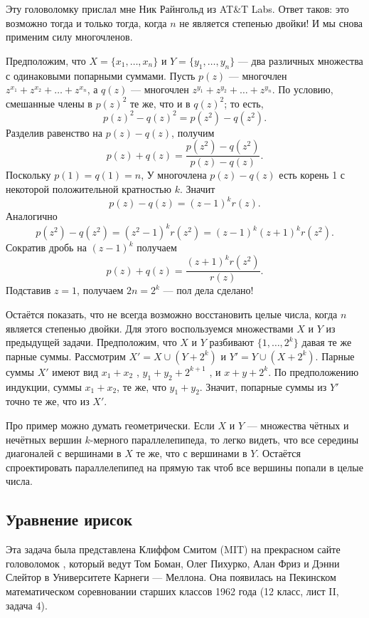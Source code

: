 Эту головоломку прислал мне Ник Райнгольд из AT\&T Labs.
Ответ таков: это возможно тогда и только тогда, когда $n$ не является степенью двойки!
И мы снова применим силу многочленов.

Предположим, что $X = \{x_1 , \dots , x_n\}$ и $Y = \{y_1 , \dots , y_n\}$ --- два различных множества с одинаковыми попарными суммами.
Пусть $p(z)$ --- многочлен $z^{x_1} + z^{x_2} + \dots + z^{x_n}$,
а $q(z)$ --- многочлен $z^{y_1} + z^{y_2} + \dots + z^{y_n}$.
По условию, смешанные члены в $p(z)^2$ те же, что и в $q(z)^2$;
то есть,
\[p(z)^2 -q(z)^2 = p(z^2 )-q(z^2).\]
Разделив равенство на $p(z) - q(z)$, получим
\[p(z) + q(z) =
\frac{p(z^2 ) - q(z^2 )}{p(z) - q(z)}.
\]
Поскольку $p(1) = q(1) = n$,
У многочлена $p(z) - q(z)$ есть корень 1 с некоторой положительной кратностью $k$.
Значит
\[p(z) - q(z) = (z - 1)^k r(z).\]
Аналогично 
\[p(z^2 ) - q(z^2 ) = (z^2 - 1)^k r(z^2 )= (z - 1)^k (z + 1)^k r(z^2).\]
Сократив дробь на $(z - 1)^k$ получаем
\[p(z) + q(z) =
\frac{(z + 1)^k r(z^2)}{r(z)}.
\]
Подставив $z = 1$, получаем $2n = 2^k$ --- пол дела сделано!

Остаётся показать, что не всегда возможно восстановить целые числа, когда $n$ является степенью двойки.
Для этого воспользуемся множествами $X$ и $Y$ из предыдущей задачи.
Предположим, что $X$ и $Y$ разбивают $\{1, \dots , 2^k\}$ давая те же парные суммы.
Рассмотрим $X' = X \cup (Y + 2^k)$ и $Y' = Y \cup (X + 2^k)$.
Парные суммы $X'$ имеют вид $x_1 + x_2$ , $y_1 + y_2 + 2^{k+1}$ , и $x + y + 2^k$.
По предположению индукции,
суммы $x_1 + x_2$, те же, что $y_1 + y_2$.
Значит, попарные суммы из $Y'$ точно те же, что из $X'$.

\begin{addedbytheeditors}
Про пример можно думать геометрически.
Если $X$ и $Y$ --- множества чётных и нечётных вершин $k$-мерного параллелепипеда, то легко видеть, что все середины диагоналей с вершинами в $X$ те же, что с вершинами в $Y$.
Остаётся спроектировать параллелепипед на прямую так чтоб все вершины попали в целые числа.
\end{addedbytheeditors}

\subsection*{Уравнение ирисок}

Эта задача была представлена Клиффом Смитом (MIT) на прекрасном сайте головоломок \cite{bohman-pikhurko-frieze-sleator}, который ведут Том Боман, Олег Пихурко, Алан Фриз и Дэнни Слейтор в Университете Карнеги — Меллона.
Она появилась на Пекинском математическом соревновании старших классов 1962 года (12 класс, лист II, задача 4).

